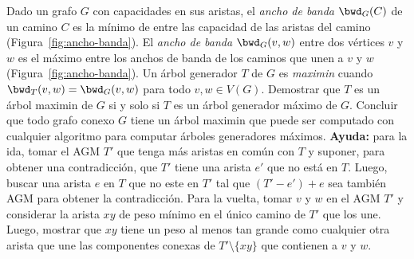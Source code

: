 
 \item Dado un grafo $G$ con capacidades en sus aristas, el \emph{ancho de banda} $\bwd_G(C)$ de un camino $C$ es la mínimo de entre las capacidad de las aristas del camino (Figura~\ref{fig:ancho-banda}).  El \emph{ancho de banda} $\bwd_G(v,w)$ entre dos vértices $v$ y $w$ es el máximo entre los anchos de banda de los caminos que unen a $v$ y $w$ (Figura~\ref{fig:ancho-banda}).  Un árbol generador $T$ de $G$ es \emph{maximin} cuando $\bwd_T(v,w) = \bwd_G(v,w)$ para todo $v,w \in V(G)$.  Demostrar que $T$ es un árbol maximin de $G$ si y solo si $T$ es un árbol generador máximo de $G$.  Concluir que todo grafo conexo $G$ tiene un árbol maximin que puede ser computado con cualquier algoritmo para computar árboles generadores máximos. \textbf{Ayuda:} para la ida, tomar el AGM $T'$ que tenga más aristas en común con $T$ y suponer, para obtener una contradicción, que $T'$ tiene una arista $e'$ que no está en $T$.  Luego, buscar una arista $e$ en $T$ que no este en $T'$ tal que $(T' - e') + e$ sea también AGM para obtener la contradicción.  Para la vuelta, tomar $v$ y $w$ en el AGM $T'$ y considerar la arista $xy$ de peso mínimo en el único camino de $T'$ que los une.  Luego, mostrar que $xy$ tiene un peso al menos tan grande como cualquier otra arista que une las componentes conexas de $T' \setminus \{xy\}$ que contienen a $v$ y $w$.


